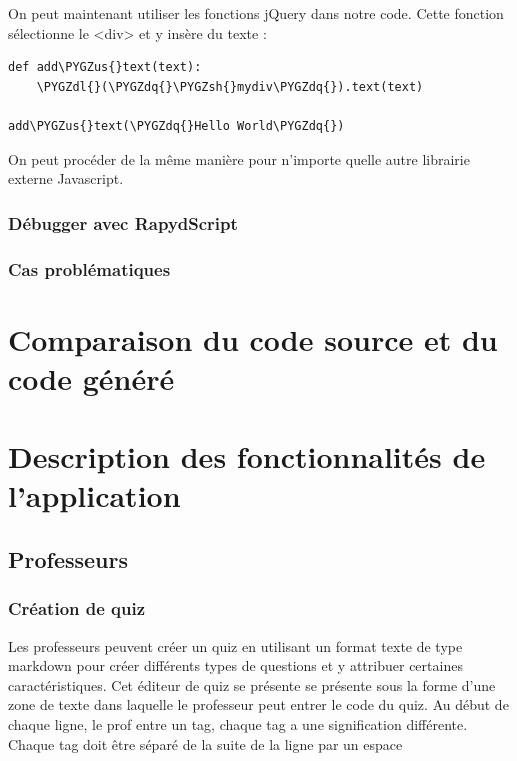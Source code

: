 \documentclass[letterpaper,10pt,french]{sphinxmanual}
\def\PYGZus{\char`\_}
\def\PYGZsh{\char`\#}
\def\PYGZdl{\char`\$}
\def\PYGZdq{\char`\"}
\begin{document}
On peut maintenant utiliser les fonctions jQuery dans notre code. Cette fonction sélectionne le \textless{}div\textgreater{} et y insère du texte :

\begin{Verbatim}[commandchars=\\\{\}]
def add\PYGZus{}text(text):
    \PYGZdl{}(\PYGZdq{}\PYGZsh{}mydiv\PYGZdq{}).text(text)

add\PYGZus{}text(\PYGZdq{}Hello World\PYGZdq{})
\end{Verbatim}

On peut procéder de la même manière pour n'importe quelle autre librairie externe Javascript.


\subsection{Débugger avec RapydScript}
\label{rapydscript:debugger-avec-rapydscript}

\subsection{Cas problématiques}
\label{rapydscript:cas-problematiques}

\chapter{Comparaison du code source et du code généré}
\label{rapydscript:comparaison-du-code-source-et-du-code-genere}

\chapter{Description des fonctionnalités de l'application}
\label{functionalities:description-des-fonctionnalites-de-l-application}\label{functionalities::doc}

\section{Professeurs}
\label{functionalities:professeurs}

\subsection{Création de quiz}
\label{functionalities:creation-de-quiz}
Les professeurs peuvent créer un quiz en utilisant un format texte de type markdown pour créer différents types de questions et y attribuer certaines caractéristiques. Cet éditeur de quiz se présente se présente sous la forme d'une zone de texte dans laquelle le professeur peut entrer le code du quiz. Au début de chaque ligne, le prof entre un tag, chaque tag a une signification différente. Chaque tag doit être séparé de la suite de la ligne par un espace
\end{document}
